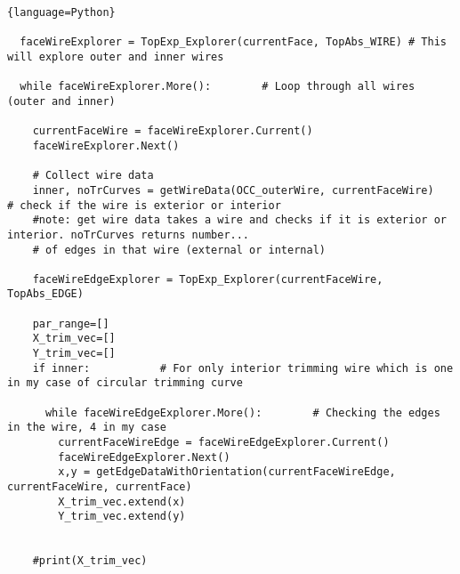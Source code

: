 \begin{adjustwidth}{-0.5cm}{-0.5cm}
\begin{lstlisting}{language=Python}
  
  faceWireExplorer = TopExp_Explorer(currentFace, TopAbs_WIRE) # This will explore outer and inner wires
  
  while faceWireExplorer.More():        # Loop through all wires (outer and inner)
    
    currentFaceWire = faceWireExplorer.Current()
    faceWireExplorer.Next()

    # Collect wire data
    inner, noTrCurves = getWireData(OCC_outerWire, currentFaceWire)   # check if the wire is exterior or interior
    #note: get wire data takes a wire and checks if it is exterior or interior. noTrCurves returns number...  
    # of edges in that wire (external or internal) 
 
    faceWireEdgeExplorer = TopExp_Explorer(currentFaceWire, TopAbs_EDGE)
    
    par_range=[]
    X_trim_vec=[]
    Y_trim_vec=[]
    if inner:           # For only interior trimming wire which is one in my case of circular trimming curve
      
      while faceWireEdgeExplorer.More():        # Checking the edges in the wire, 4 in my case
        currentFaceWireEdge = faceWireEdgeExplorer.Current()
        faceWireEdgeExplorer.Next()
        x,y = getEdgeDataWithOrientation(currentFaceWireEdge, currentFaceWire, currentFace)
        X_trim_vec.extend(x)
        Y_trim_vec.extend(y)
        
        
    #print(X_trim_vec)
        
      
 
    
  





\end{lstlisting}
\end{adjustwidth}
